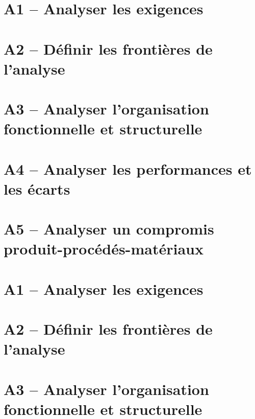 \proffalse
\section{A1 -- Analyser les exigences}
\begin{multicols}{2}
\end{multicols}

\section{A2 -- Définir les frontières de l'analyse}
\begin{multicols}{2}
\end{multicols}

\section{A3 -- Analyser l'organisation fonctionnelle et structurelle}
\begin{multicols}{2}

\end{multicols}

\section{A4 -- Analyser les performances et les écarts}
\begin{multicols}{2}
\end{multicols}

\section{A5 -- Analyser un compromis produit-procédés-matériaux}
\begin{multicols}{2}
\end{multicols}


\proftrue
\newpage
\section{A1 -- Analyser les exigences}

\section{A2 -- Définir les frontières de l'analyse}

\section{A3 -- Analyser l'organisation fonctionnelle et structurelle}

